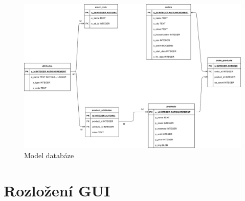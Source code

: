 \documentclass[12pt]{report}
\begin{document}
\begin{figure}[H]
	\centering
	\includegraphics[width=1.13\textwidth,angle=270,origin=c]{img/medovka_diagram.png}
	\caption{Model databáze}
	\label{fig:model}
\end{figure}
%
\chapter{Rozložení GUI}
%
\end{document}
